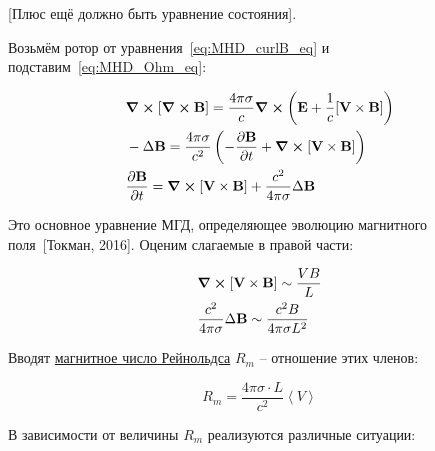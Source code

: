 \documentclass[10pt, a4paper]{article}
\newcommand{\Tokman}{~[Токман, 2016]}
\begin{document}
[Плюс ещё должно быть уравнение состояния].

Возьмём ротор от уравнения~\eqref{eq:MHD_curlB_eq} и подставим~\eqref{eq:MHD_Ohm_eq}:

\begin{align}
	&\curl{[\curl{\vb{B}}]} = \frac{4\pi\sigma}{c}\curl{\left( \vb{E} + \frac{1}{c}[\vb{V}\times\vb{B}] \right)} \\ \nonumber
	&-\Delta\vb{B} = \frac{4\pi\sigma}{c^2}\left( -\pdv{\vb{B}}{t} + \curl{[\vb{V}\times\vb{B}]} \right) \\ \nonumber
	&\pdv{\vb{B}}{t} = \curl{[\vb{V}\times\vb{B}]} + \frac{c^2}{4\pi\sigma}\Delta\vb{B}
\end{align}

Это основное уравнение МГД, определяющее эволюцию магнитного поля\Tokman. Оценим слагаемые в правой части:

\begin{align*}
	&\curl{[\vb{V}\times\vb{B}]} \sim \frac{VB}{L} \\
	&\frac{c^2}{4\pi\sigma}\Delta\vb{B} \sim \frac{c^2B}{4\pi\sigma L^2}
\end{align*}

Вводят \uline{магнитное число Рейнольдса} $R_m$ -- отношение этих членов:

\begin{equation*}
	R_m = \frac{4\pi\sigma \cdot L}{c^2}\left\langle V\right\rangle 
\end{equation*}

В зависимости  от величины $R_m$ реализуются различные ситуации:
\end{document}
